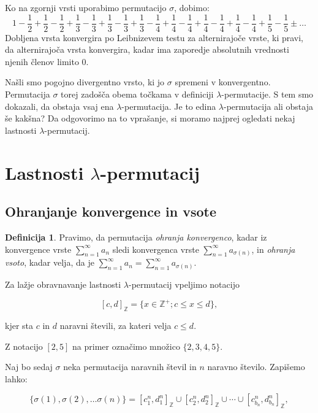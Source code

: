 \documentclass[12pt,a4paper,reqno]{amsart}
\theoremstyle{definition} %
\newtheorem{definicija}{Definicija}[section]
\theoremstyle{plain} %
\newcommand{\Z}{\mathbb Z}
\begin{document}
Ko na zgornji vrsti uporabimo permutacijo $\sigma$, dobimo:
$$1-\frac{1}{2}+\frac{1}{2}-\frac{1}{2}+\frac{1}{3}-\frac{1}{3}+\frac{1}{3}-\frac{1}{3}+\frac{1}{3}-\frac{1}{4}+\frac{1}{4}-\frac{1}{4}+\frac{1}{4}-\frac{1}{4}+\frac{1}{4}-\frac{1}{4}+\frac{1}{5}-\frac{1}{5} \pm \dots$$
Dobljena vrsta konvergira po Leibnizevem testu za alternirajoče vrste, ki pravi, da alternirajoča vrsta konvergira, kadar ima zaporedje absolutnih vrednosti njenih členov limito 0. %

Našli smo pogojno divergentno vrsto, ki jo $\sigma$ spremeni v konvergentno. Permutacija $\sigma$ torej zadošča obema točkama v definiciji $\lambda$-permutacije. S tem smo dokazali, da obstaja vsaj ena $\lambda$-permutacija. Je to edina $\lambda$-permutacija ali obstaja še kakšna? Da odgovorimo na to vprašanje, si moramo najprej ogledati nekaj lastnosti $\lambda$-permutacij.

\section{Lastnosti $\lambda$-permutacij}
\subsection{Ohranjanje konvergence in vsote}

\begin{definicija}
Pravimo, da permutacija \emph{ohranja konvergenco}, kadar iz konvergence vrste $\sum^{\infty}_{n=1}a_n$ sledi konvergenca vrste $\sum^{\infty}_{n=1}a_{\sigma (n)}$, in \emph{ohranja vsoto}, kadar velja, da je $\sum^{\infty}_{n=1}a_n=\sum^{\infty}_{n=1}a_{\sigma (n)}$.
\end{definicija}

Za lažje obravnavanje lastnosti $\lambda$-permutacij vpeljimo notacijo %

$$[c,d]_{\Z}=\{x \in \Z^+ ; c \leq x \leq d \},$$

kjer sta $c$ in $d$ naravni števili, za kateri velja $c\leq d$. 

Z notacijo $[2,5]$ na primer označimo množico $\{2,3,4,5\}$.

Naj bo sedaj $\sigma$ neka permutacija naravnih števil in $n$ naravno število. Zapišemo lahko:

\begin{equation} \label{eq:4}
\{ \sigma (1), \sigma (2), \ldots \sigma (n) \} = [c^n_1, d^n_1]_{\Z} \cup [c^n_2, d^n_2]_{\Z} \cup \cdots \cup [c^n_{b_n}, d^n_{b_n}]_{\Z},
\end{equation} 
\end{document}
